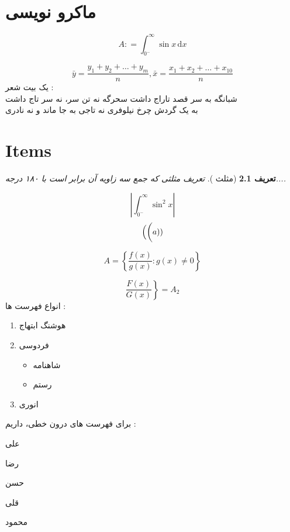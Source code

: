 \documentclass{book}
\newtheorem{Def}{تعریف}[section]
\newcommand{\dd}{\, \mathrm{d}}
\newcommand{\mian}[2]{\frac{#1_1 + #1_2 + \dots + #1_{#2}}{n}}
\begin{document}
\chapter{ماکرو نویسی}
\[
A \colon = \int_{0^{-}}^{\infty} \sin x \dd x
\]

\[
\bar{y} = \mian{y}{m}, \bar{x} = \mian{x}{10}
\]
 	یک بیت شعر :
 	\vspace*{0.25cm}
\\
شبانگه به سر قصد تاراج داشت \hspace*{1.7cm} سحرگه نه تن سر، نه سر تاج داشت 
\\
به یک گردش چرخ نیلوفری \hspace*{2cm} نه تاجی به جا ماند و نه نادری


\chapter{Items}

\begin{Def}[مثلث ]
	تعریف مثلثی که جمع سه زاویه آن برابر است با ۱۸۰ درجه....
\end{Def}
\Time
\[
\left\lvert \int_{0^-}^{\infty} \sin^2 x \right\rvert
\]
\[
\Big( \bigg( a)\small)
\]

\[
A = \left\lbrace \frac{f(x)}{g(x)} \colon g(x) \neq 0 \right\rbrace
\]

\[
\left. \frac{F(x)}{G(x)} \right \rbrace = A_2
\]
\BNaz
انواع فهرست ها :
\begin{enumerate}
	\item 
	هوشنگ ابتهاج
	\item 
	فردوسی
	\begin{itemize}
		\item 
		شاهنامه
		\item 
		رستم
	\end{itemize}
		\item 
		انوری
\end{enumerate}

برای فهرست های درون خطی، داریم :
\begin{inparaitem}
	\item 
	علی
	\item 
	رضا
	\begin{inparaitem}
		\item  
		حسن
		\item 
		قلی
	\end{inparaitem}
	\item  
	محمود
\end{inparaitem}
\end{document}
